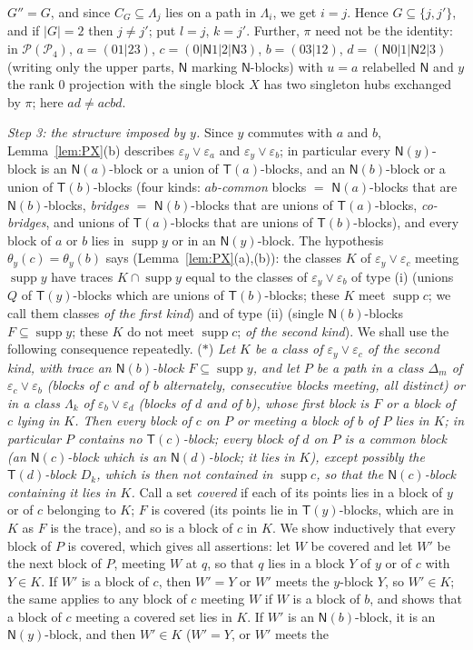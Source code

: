 \documentclass[11pt]{amsart}
\theoremstyle{definition}
\renewcommand{\P}{\mathcal{P}}
\newcommand{\supp}{\operatorname{supp}}
\newcommand{\T}{\mathsf{T}}
\newcommand{\N}{\mathsf{N}}
\begin{document}
$G''=G$, and since $C_G\subseteq\Lambda_j$ lies on a path in $\Lambda_i$, we get $i=j$. Hence $G\subseteq\{j,j'\}$, and if $|G|=2$ then $j\ne j'$; put $l=j$, $k=j'$. Further, $\pi$ need not be the identity: in $\P(\P_4)$, $a=(01|23)$, $c=(0|\N1|2|\N3)$, $b=(03|12)$, $d=(\N0|1|\N2|3)$ (writing only the upper parts, $\N$ marking $\N$-blocks) with $u=a$ relabelled $\N$ and $y$ the rank $0$ projection with the single block $X$ has two singleton hubs exchanged by $\pi$; here $ad\ne acbd$.

\smallskip
\emph{Step 3: the structure imposed by $y$.} Since $y$ commutes with $a$ and $b$, Lemma~\ref{lem:PX}(b) describes $\varepsilon_y\vee\varepsilon_a$ and $\varepsilon_y\vee\varepsilon_b$; in particular every $\N(y)$-block is an $\N(a)$-block or a union of $\T(a)$-blocks, and an $\N(b)$-block or a union of $\T(b)$-blocks (four kinds: \emph{$ab$-common} blocks $=$ $\N(a)$-blocks that are $\N(b)$-blocks, \emph{bridges} $=$ $\N(b)$-blocks that are unions of $\T(a)$-blocks, \emph{co-bridges}, and unions of $\T(a)$-blocks that are unions of $\T(b)$-blocks), and every block of $a$ or $b$ lies in $\supp y$ or in an $\N(y)$-block. The hypothesis $\theta_y(c)=\theta_y(b)$ says (Lemma~\ref{lem:PX}(a),(b)): the classes $K$ of $\varepsilon_y\vee\varepsilon_c$ meeting $\supp y$ have traces $K\cap\supp y$ equal to the classes of $\varepsilon_y\vee\varepsilon_b$ of type (i) (unions $Q$ of $\T(y)$-blocks which are unions of $\T(b)$-blocks; these $K$ meet $\supp c$; we call them classes \emph{of the first kind}) and of type (ii) (single $\N(b)$-blocks $F\subseteq\supp y$; these $K$ do not meet $\supp c$; \emph{of the second kind}). We shall use the following consequence repeatedly. \textup{($*$)} \emph{Let $K$ be a class of $\varepsilon_y\vee\varepsilon_c$ of the second kind, with trace an $\N(b)$-block $F\subseteq\supp y$, and let $P$ be a path in a class $\Delta_m$ of $\varepsilon_c\vee\varepsilon_b$ (blocks of $c$ and of $b$ alternately, consecutive blocks meeting, all distinct) or in a class $\Lambda_k$ of $\varepsilon_b\vee\varepsilon_d$ (blocks of $d$ and of $b$), whose first block is $F$ or a block of $c$ lying in $K$. Then every block of $c$ on $P$ or meeting a block of $b$ of $P$ lies in $K$; in particular $P$ contains no $\T(c)$-block; every block of $d$ on $P$ is a common block (an $\N(c)$-block which is an $\N(d)$-block; it lies in $K$), except possibly the $\T(d)$-block $D_k$, which is then not contained in $\supp c$, so that the $\N(c)$-block containing it lies in $K$.} Call a set \emph{covered} if each of its points lies in a block of $y$ or of $c$ belonging to $K$; $F$ is covered (its points lie in $\T(y)$-blocks, which are in $K$ as $F$ is the trace), and so is a block of $c$ in $K$. We show inductively that every block of $P$ is covered, which gives all assertions: let $W$ be covered and let $W'$ be the next block of $P$, meeting $W$ at $q$, so that $q$ lies in a block $Y$ of $y$ or of $c$ with $Y\in K$. If $W'$ is a block of $c$, then $W'=Y$ or $W'$ meets the $y$-block $Y$, so $W'\in K$; the same applies to any block of $c$ meeting $W$ if $W$ is a block of $b$, and shows that a block of $c$ meeting a covered set lies in $K$. If $W'$ is an $\N(b)$-block, it is an $\N(y)$-block, and then $W'\in K$ ($W'=Y$, or $W'$ meets the 
\end{document}
